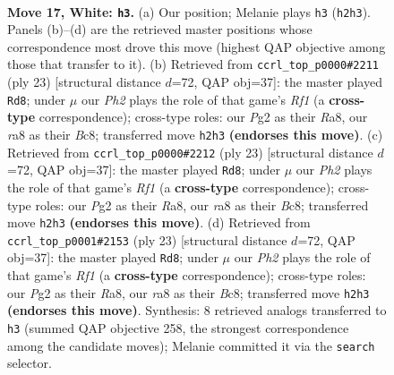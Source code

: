 \documentclass[11pt]{article}
\begin{document}
\clearpage

\begin{figure}[p]\centering
\begin{subfigure}{0.46\textwidth}\centering
\resizebox{\linewidth}{!}{%
\newchessgame
\chessboard[
  setfen={rnbr3k/5p2/1p2pn2/p1b4p/2B3p1/2N1P1B1/PP3PPP/R1R1N1K1 w - - 2 17},
  showmover=false,
  pgfstyle=straightmove, color=movearrow, markmove={h2-h3}
]}
\caption{}
\end{subfigure}\hfill
\begin{subfigure}{0.46\textwidth}\centering
\resizebox{\linewidth}{!}{%
\newchessgame
\chessboard[
  setfen={r1b2rk1/1p1n1ppp/p3p3/P1bn4/2N5/2PB1N2/1P3PPP/R1B1K2R b KQ - 2 12},
  showmover=false,
  pgfstyle=straightmove, color=movearrow, markmove={f8-d8}
]}
\caption{}
\end{subfigure}
\\[4pt]
\begin{subfigure}{0.46\textwidth}\centering
\resizebox{\linewidth}{!}{%
\newchessgame
\chessboard[
  setfen={r1b2rk1/1p1n1ppp/p3p3/P1bn4/2N5/2PB1N2/1P3PPP/R1B1K2R b KQ - 2 12},
  showmover=false,
  pgfstyle=straightmove, color=movearrow, markmove={f8-d8}
]}
\caption{}
\end{subfigure}\hfill
\begin{subfigure}{0.46\textwidth}\centering
\resizebox{\linewidth}{!}{%
\newchessgame
\chessboard[
  setfen={r1b2rk1/1p1n1ppp/p3p3/P1bn4/2N5/2PB1N2/1P3PPP/R1B1K2R b KQ - 2 12},
  showmover=false,
  pgfstyle=straightmove, color=movearrow, markmove={f8-d8}
]}
\caption{}
\end{subfigure}
\caption{\textbf{Move 17, White: \texttt{h3}.} (a) Our position; Melanie plays \texttt{h3} (\texttt{h2h3}). Panels (b)--(d) are the retrieved master positions whose correspondence most drove this move (highest QAP objective among those that transfer to it). (b) Retrieved from \texttt{ccrl\_top\_p0000\#2211} (ply 23) [structural distance $d$=72, QAP obj=37]: the master played \texttt{Rd8}; under $\mu$ our \emph{Ph2} plays the role of that game's \emph{Rf1} (a \textbf{cross-type} correspondence); cross-type roles: our \emph{P}g2 as their \emph{R}a8, our \emph{r}a8 as their \emph{B}c8; transferred move \texttt{h2h3} \textbf{(endorses this move)}. (c) Retrieved from \texttt{ccrl\_top\_p0000\#2212} (ply 23) [structural distance $d$=72, QAP obj=37]: the master played \texttt{Rd8}; under $\mu$ our \emph{Ph2} plays the role of that game's \emph{Rf1} (a \textbf{cross-type} correspondence); cross-type roles: our \emph{P}g2 as their \emph{R}a8, our \emph{r}a8 as their \emph{B}c8; transferred move \texttt{h2h3} \textbf{(endorses this move)}. (d) Retrieved from \texttt{ccrl\_top\_p0001\#2153} (ply 23) [structural distance $d$=72, QAP obj=37]: the master played \texttt{Rd8}; under $\mu$ our \emph{Ph2} plays the role of that game's \emph{Rf1} (a \textbf{cross-type} correspondence); cross-type roles: our \emph{P}g2 as their \emph{R}a8, our \emph{r}a8 as their \emph{B}c8; transferred move \texttt{h2h3} \textbf{(endorses this move)}. Synthesis: 8 retrieved analogs transferred to \texttt{h3} (summed QAP objective 258, the strongest correspondence among the candidate moves); Melanie committed it via the \texttt{search} selector.}
\label{fig:thought-m32}
\end{figure}
\end{document}
